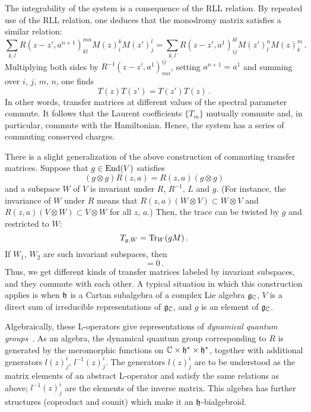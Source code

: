 The integrability of the system is a consequence of the RLL relation.
By repeated use of the RLL relation, one deduces that the monodromy
matrix satisfies a similar relation:
\begin{equation}
  \sum_{k,l}
  R(z-z', a^{n+1})^{mn}_{kl}
  M(z)^k_i M(z')^l_j
  =
  \sum_{k,l}
  R(z-z', a^1)^{kl}_{ij}
  M(z')^n_l M(z)^m_k
  \,.
\end{equation}
Multiplying both sides by $R^{-1}(z-z', a^1)^{ij}_{mn}$, setting
$a^{n+1} = a^1$ and summing over $i$, $j$, $m$, $n$, one
finds
\begin{equation}
  T(z) T(z') = T(z') T(z) \,.
\end{equation}
In other words, transfer matrices at different values of the spectral
parameter commute.  It follows that the Laurent coefficients $\{T_m\}$
mutually commute and, in particular, commute with the Hamiltonian.
Hence, the system has a series of commuting conserved charges.

There is a slight generalization of the above construction of
commuting transfer matrices.  Suppose that $g \in \mathop{\mathrm{End}}\nolimits(V)$ satisfies
\begin{equation}
  (g \otimes g) R(z,a)
  =  R(z,a) (g \otimes g)
\end{equation}
and a subspace $W$ of $V$ is invariant under $R$, $R^{-1}$, $L$ and
$g$.  (For instance, the invariance of $W$ under $R$ means that
$R(z,a)(W \otimes V) \subset W \otimes V$ and
$R(z,a)(V \otimes W) \subset V \otimes W$ for all $z$, $a$.)  Then,
the trace can be twisted by $g$ and restricted to $W$:
\begin{equation}
  T_{g,W} = \mathop{\mathrm{Tr}}\nolimits_W(gM) \,.
\end{equation}
If $W_1$, $W_2$ are such invariant subspaces, then
\begin{equation}
  [T_{g,W_1}(z), T_{g,W_2}(z')] = 0 \,.
\end{equation}
Thus, we get different kinds of transfer matrices labeled by invariant
subspaces, and they commute with each other.  A typical situation in
which this construction applies is when $\mathfrak{h}$ is a Cartan subalgebra
of a complex Lie algebra $\mathfrak{g}_{\mathbb{C}}$, $V$ is a direct sum of irreducible
representations of $\mathfrak{g}_{\mathbb{C}}$, and $g$ is an element of $\mathfrak{g}_{\mathbb{C}}$.

Algebraically, these L-operators give representations of \emph{dynamical
quantum groups}~\cite{Felder:1994be, Felder:1994pb, MR1645196}.  As
an algebra, the dynamical quantum group corresponding to $R$ is
generated by the meromorphic functions on
$\mathbb{C} \times \mathfrak{h}^* \times \mathfrak{h}^*$, together with additional generators
$l(z)^i_j$, $l^{-1}(z)^i_j$.  The generators $l(z)^i_j$ are to be
understood as the matrix elements of an abstract L-operator and
satisfy the same relations as above; $l^{-1}(z)^i_j$ are the elements
of the inverse matrix.  This algebra has further structures (coproduct
and counit) which make it an $\mathfrak{h}$-bialgebroid.






